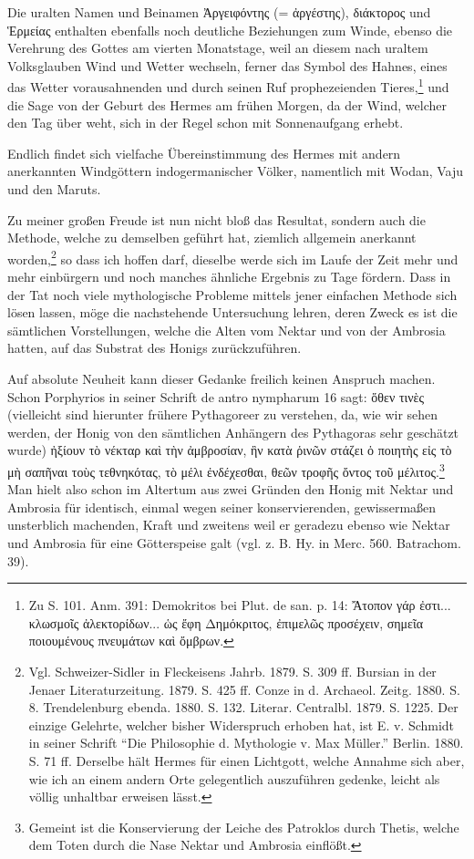 \documentclass[a4paper, 11pt, oneside]{article}
\begin{document}
Die uralten Namen und Beinamen Ἀργειφόντης (= ἀργέστης), διάκτορος und Ἑρμείας enthalten ebenfalls noch deutliche Beziehungen zum Winde, ebenso die Verehrung des Gottes am vierten Monatstage, weil an diesem nach uraltem Volksglauben Wind und Wetter wechseln, ferner das Symbol des Hahnes, eines das Wetter vorausahnenden und durch seinen Ruf prophezeienden Tieres,\footnote{Zu S. 101. Anm. 391: Demokritos bei Plut. de san. p. 14: Ἄτοπον γάρ ἐστι... κλωσμοῖς ἀλεκτορίδων... ὡς ἔφη Δημόκριτος, ἐπιμελῶς προσέχειν, σημεῖα ποιουμένους πνευμάτων καὶ ὄμβρων.} und die Sage von der Geburt des Hermes am frühen Morgen, da der Wind, welcher den Tag über weht, sich in der Regel schon mit Sonnenaufgang erhebt.

Endlich findet sich vielfache Übereinstimmung des Hermes mit andern anerkannten Windgöttern indogermanischer Völker, namentlich mit Wodan, Vaju und den Maruts.

Zu meiner großen Freude ist nun nicht bloß das Resultat, sondern auch die Methode, welche zu demselben geführt hat, ziemlich allgemein anerkannt worden,\footnote{Vgl. Schweizer-Sidler in Fleckeisens Jahrb. 1879. S. 309 ff. Bursian in der Jenaer Literaturzeitung. 1879. S. 425 ff. Conze in d. Archaeol. Zeitg. 1880. S. 8. Trendelenburg ebenda. 1880. S. 132. Literar. Centralbl. 1879. S. 1225. Der einzige Gelehrte, welcher bisher Widerspruch erhoben hat, ist E. v. Schmidt in seiner Schrift "`Die Philosophie d. Mythologie v. Max Müller."' Berlin. 1880. S. 71 ff. Derselbe hält Hermes für einen Lichtgott, welche Annahme sich aber, wie ich an einem andern Orte gelegentlich auszuführen gedenke, leicht als völlig unhaltbar erweisen lässt.} so dass ich hoffen darf, dieselbe werde sich im Laufe der Zeit mehr und mehr einbürgern und noch manches ähnliche Ergebnis zu Tage fördern. Dass in der Tat noch viele mythologische Probleme mittels jener einfachen Methode sich lösen lassen, möge die nachstehende Untersuchung lehren, deren Zweck es ist die sämtlichen Vorstellungen, welche die Alten vom Nektar und von der Ambrosia hatten, auf das Substrat des Honigs zurückzuführen.

Auf absolute Neuheit kann dieser Gedanke freilich keinen Anspruch machen. Schon Porphyrios in seiner Schrift de antro nympharum 16 sagt: ὅθεν τινὲς (vielleicht sind hierunter frühere Pythagoreer zu verstehen, da, wie wir sehen werden, der Honig von den sämtlichen Anhängern des Pythagoras sehr geschätzt wurde) ἠξίουν τὸ νέκταρ καὶ τὴν ἀμβροσίαν, ἣν κατὰ ῥινῶν στάζει ὁ ποιητὴς εἰς τὸ μὴ σαπῆναι τοὺς τεθνηκότας, τὸ μέλι ἐνδέχεσθαι, θεῶν τροφῆς ὄντος τοῦ μέλιτος.\footnote{Gemeint ist die Konservierung der Leiche des Patroklos durch Thetis, welche dem Toten durch die Nase Nektar und Ambrosia einflößt.} Man hielt also schon im Altertum aus zwei Gründen den Honig mit Nektar und Ambrosia für identisch, einmal wegen seiner konservierenden, gewissermaßen unsterblich machenden, Kraft und zweitens weil er geradezu ebenso wie Nektar und Ambrosia für eine Götterspeise galt (vgl. z. B. Hy. in Merc. 560. Batrachom. 39).
\end{document}
